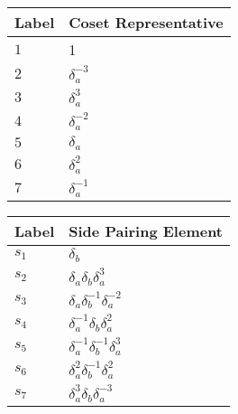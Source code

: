 \documentclass{article}
\begin{document}
\begin{center}
\begin{tabular}{ll}
\toprule
Label & Coset Representative\\
\midrule
$1$ & 1 \\
$2$ & $\delta_a^{-3}$ \\
$3$ & $\delta_a^{3}$ \\
$4$ & $\delta_a^{-2}$ \\
$5$ & $\delta_a^{}$ \\
$6$ & $\delta_a^{2}$ \\
$7$ & $\delta_a^{-1}$ \\
\bottomrule
\end{tabular}
\hfill
\begin{tabular}{ll}
\toprule
Label & Side Pairing Element\\
\midrule
$s_{1}$ & $\delta_b^{}$ \\
$s_{2}$ & $\delta_a^{}\delta_b^{}\delta_a^{3}$ \\
$s_{3}$ & $\delta_a^{}\delta_b^{-1}\delta_a^{-2}$ \\
$s_{4}$ & $\delta_a^{-1}\delta_b^{}\delta_a^{2}$ \\
$s_{5}$ & $\delta_a^{-1}\delta_b^{-1}\delta_a^{3}$ \\
$s_{6}$ & $\delta_a^{2}\delta_b^{-1}\delta_a^{2}$ \\
$s_{7}$ & $\delta_a^{3}\delta_b^{}\delta_a^{-3}$ \\
\bottomrule
\end{tabular}
\end{center}

\thispagestyle{empty}
\end{document}
